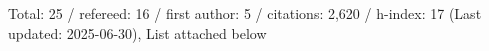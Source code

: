 Total: 25 / refereed: 16 / first author: 5 / citations: 2,620 / h-index: 17 (Last updated: 2025-06-30), List attached below